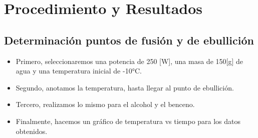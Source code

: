 \documentclass[a4paper, 12p]{article}
\begin{document}
\section{Procedimiento y Resultados}


\subsection{Determinación puntos de fusión y de ebullición}
\begin{itemize}
      \item Primero, seleccionaremos una potencia de 250 [W], una masa de 150[g] de agua y una temperatura inicial de -10°C.
      \item Segundo, anotamos la temperatura, hasta llegar al punto de ebullición.
      \item Tercero, realizamos lo mismo para el alcohol y el benceno.
      \item Finalmente, hacemos un gráfico de temperatura vs tiempo para los datos obtenidos.
\end{itemize}
\end{document}
